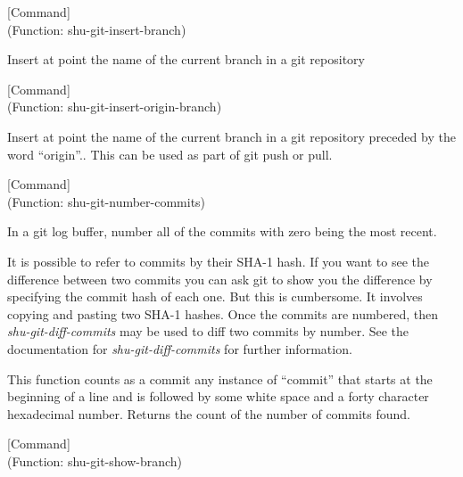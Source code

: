 \vspace{1em}
\noindent
{}
\usebox{\funcname}
 \hfill [Command]\\%
 (Function: shu-git-insert-branch)

\begin{doc-string}
Insert at point the name of the current branch in a git repository
\end{doc-string}

\vspace{1em}
\noindent
{}
\usebox{\funcname}
 \hfill [Command]\\%
 (Function: shu-git-insert-origin-branch)

\begin{doc-string}
Insert at point the name of the current branch in a git repository preceded by the
word ``origin''..  This can be used as part of git push or pull.
\end{doc-string}

\vspace{1em}
\noindent
{}
\usebox{\funcname}
 \hfill [Command]\\%
 (Function: shu-git-number-commits)

\begin{doc-string}
In a git log buffer, number all of the commits with zero being the most
recent.

It is possible to refer to commits by their SHA-1 hash.  If you want to see the
difference between two commits you can ask git to show you the difference by
specifying the commit hash of each one.  But this is cumbersome.  It involves
copying and pasting two SHA-1 hashes.  Once the commits are numbered, then
\emph{shu-git-diff-commits} may be used to diff two commits by number.  See the
documentation for \emph{shu-git-diff-commits} for further information.

This function counts as a commit any instance of ``commit'' that starts at the
beginning of a line and is followed by some white space and a forty character
hexadecimal number.  Returns the count of the number of commits found.
\end{doc-string}

\vspace{1em}
\noindent
{}
\usebox{\funcname}
 \hfill [Command]\\%
 (Function: shu-git-show-branch)

